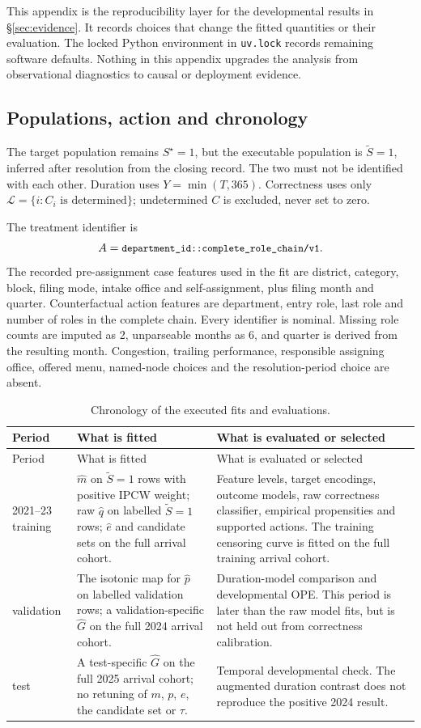 \documentclass[11pt,a4paper]{article}
\theoremstyle{plain}
\theoremstyle{definition}
\theoremstyle{remark}
\newcommand{\code}[1]{\texttt{\small #1}}
\newcommand{\Sstar}{S^{\star}}
\newcommand{\Sproxy}{\widetilde S}
\begin{document}
This appendix is the reproducibility layer for the developmental results in
\S\ref{sec:evidence}. It records choices that change the fitted quantities or their evaluation.
The locked Python environment in \code{uv.lock} records remaining software defaults. Nothing in
this appendix upgrades the analysis from observational diagnostics to causal or deployment
evidence.

\subsection{Populations, action and chronology}

The target population remains $\Sstar=1$, but the executable population is
$\Sproxy=1$, inferred after resolution from the closing record. The two must not be identified
with each other. Duration uses $Y=\min(T,365)$. Correctness uses only
$\mathcal L=\{i:C_i\text{ is determined}\}$; undetermined $C$ is excluded, never set to zero.

The treatment identifier is
\[
A=\code{department\_id::complete\_role\_chain/v1}.
\]
The recorded pre-assignment case features used in the fit are district, category, block, filing
mode, intake office and self-assignment, plus filing month and quarter. Counterfactual action
features are department, entry role, last role and number of roles in the complete chain. Every
identifier is nominal. Missing role counts are imputed as 2, unparseable months as 6, and
quarter is derived from the resulting month. Congestion, trailing performance, responsible
assigning office, offered menu, named-node choices and the resolution-period choice are absent.

\begin{longtable}{p{2.2cm}p{4.8cm}p{7.0cm}}
\caption{Chronology of the executed fits and evaluations.}\label{tab:asrun-time}\\
\toprule
Period & What is fitted & What is evaluated or selected\\
\midrule
\endfirsthead
\toprule
Period & What is fitted & What is evaluated or selected\\
\midrule
\endhead
2021--23 training &
$\hat m$ on $\Sproxy=1$ rows with positive IPCW weight; raw $\hat q$ on labelled
$\Sproxy=1$ rows; $\hat e$ and candidate sets on the full arrival cohort. &
Feature levels, target encodings, outcome models, raw correctness classifier, empirical
propensities and supported actions. The training censoring curve is fitted on the full training
arrival cohort.\\
\addlinespace
2024 validation &
The isotonic map for $\hat p$ on labelled validation rows; a validation-specific $\hat G$ on the
full 2024 arrival cohort. &
Duration-model comparison and developmental OPE. This period is later than the raw model fits,
but is not held out from correctness calibration.\\
\addlinespace
2025 test &
A test-specific $\hat G$ on the full 2025 arrival cohort; no retuning of $m$, $p$, $e$, the
candidate set or $\tau$. &
Temporal developmental check. The augmented duration contrast does not reproduce the positive
2024 result.\\
\bottomrule
\end{longtable}
\end{document}
